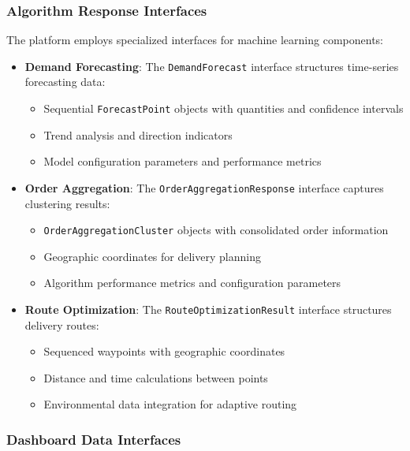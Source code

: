 \subsubsection{Algorithm Response Interfaces}

The platform employs specialized interfaces for machine learning components:

\begin{itemize}
    \item \textbf{Demand Forecasting}: The \texttt{DemandForecast} interface structures time-series forecasting data:
          \begin{itemize}
              \item Sequential \texttt{ForecastPoint} objects with quantities and confidence intervals
              \item Trend analysis and direction indicators
              \item Model configuration parameters and performance metrics
          \end{itemize}

    \item \textbf{Order Aggregation}: The \texttt{OrderAggregationResponse} interface captures clustering results:
          \begin{itemize}
              \item \texttt{OrderAggregationCluster} objects with consolidated order information
              \item Geographic coordinates for delivery planning
              \item Algorithm performance metrics and configuration parameters
          \end{itemize}

    \item \textbf{Route Optimization}: The \texttt{RouteOptimizationResult} interface structures delivery routes:
          \begin{itemize}
              \item Sequenced waypoints with geographic coordinates
              \item Distance and time calculations between points
              \item Environmental data integration for adaptive routing
          \end{itemize}
\end{itemize}

\subsubsection{Dashboard Data Interfaces}

